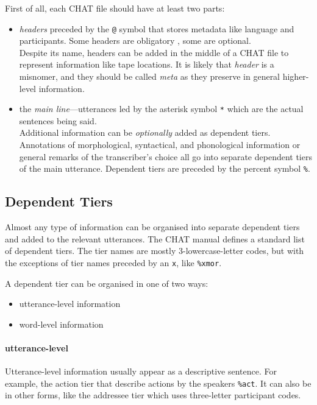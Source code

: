 First of all, each CHAT file should have at least two parts:
\begin{itemize}
	\item \emph{headers} preceded by the \texttt{@} symbol that stores metadata like language and participants. Some headers are obligatory , some are optional.\\
	Despite its name, headers can be added in the middle of a CHAT file to represent information like tape locations. It is likely that \emph{header} is a misnomer, and they should be called \emph{meta} as they preserve in general higher-level information.
	\item the \emph{main line}---utterances led by the asterisk symbol \texttt{*} which are the actual sentences being said.\\
	Additional information can be \emph{optionally} added as dependent tiers. Annotations of morphological, syntactical, and phonological information or general remarks of the transcriber's choice all go into separate dependent tiers of the main utterance. Dependent tiers are preceded by the percent symbol \texttt{\%}.
\end{itemize}

\subsection{Dependent Tiers}
Almost any type of information can be organised into separate dependent tiers and added to the relevant utterances. The CHAT manual defines a standard list of dependent tiers. The tier names are mostly 3-lowercase-letter codes, but with the exceptions of tier names preceded by an \texttt{x}, like \texttt{\%xmor}.

A dependent tier can be organised in one of two ways:
\begin{itemize}
	\item utterance-level information
	\item word-level information
\end{itemize}

\paragraph{utterance-level}
Utterance-level information usually appear as a descriptive sentence. For example, the action tier that describe actions by the speakers \texttt{\%act}. It can also be in other forms, like the addressee tier which uses three-letter participant codes.

